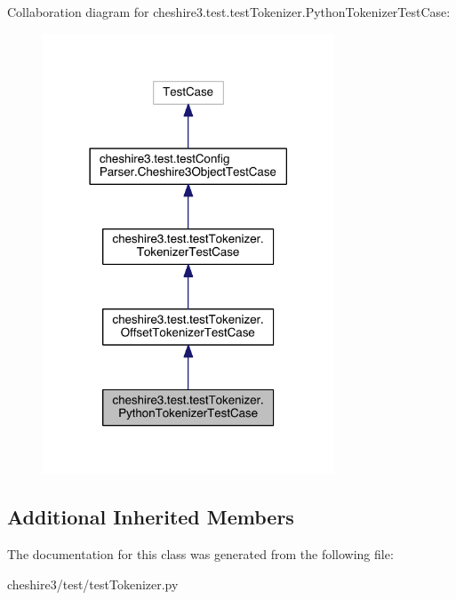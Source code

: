 Collaboration diagram for cheshire3.\-test.\-test\-Tokenizer.\-Python\-Tokenizer\-Test\-Case\-:
\nopagebreak
\begin{figure}[H]
\begin{center}
\leavevmode
\includegraphics[width=246pt]{classcheshire3_1_1test_1_1test_tokenizer_1_1_python_tokenizer_test_case__coll__graph}
\end{center}
\end{figure}
\subsection*{Additional Inherited Members}


The documentation for this class was generated from the following file\-:\begin{DoxyCompactItemize}
\item 
cheshire3/test/test\-Tokenizer.\-py\end{DoxyCompactItemize}
